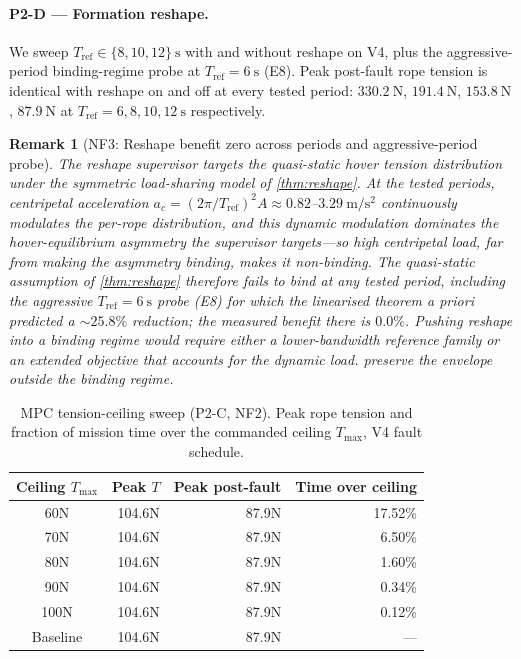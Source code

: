\documentclass[lettersize,journal]{IEEEtran}
\newtheorem{remark}{Remark}%
\begin{document}
\paragraph{P2-D --- Formation reshape.} We sweep $T_{\mathrm{ref}} \in \{8, 10, 12\}~\si{\second}$ with and without reshape on V4, plus the aggressive-period binding-regime probe at $T_{\mathrm{ref}}=\SI{6}{\second}$ (E8). Peak post-fault rope tension is identical with reshape on and off at every tested period: $\SI{330.2}{\newton}$, $\SI{191.4}{\newton}$, $\SI{153.8}{\newton}$, $\SI{87.9}{\newton}$ at $T_{\mathrm{ref}} = 6, 8, 10, 12~\si{\second}$ respectively.

\begin{remark}[NF3: Reshape benefit zero across periods and aggressive-period probe]
\label{rem:reshape-null}
  The reshape supervisor targets the quasi-static hover tension distribution under the symmetric load-sharing model of \cref{thm:reshape}. At the tested periods, centripetal acceleration $a_c = (2\pi/T_{\mathrm{ref}})^2 A \approx 0.82$--$3.29~\si{\metre\per\second\squared}$ continuously modulates the per-rope distribution, and this dynamic modulation dominates the hover-equilibrium asymmetry the supervisor targets---so high centripetal load, far from making the asymmetry binding, makes it \emph{non}-binding. The quasi-static assumption of \cref{thm:reshape} therefore fails to bind at any tested period, including the aggressive $T_{\mathrm{ref}}=\SI{6}{\second}$ probe (E8) for which the linearised theorem a priori predicted a $\sim 25.8\%$ reduction; the measured benefit there is $0.0\%$. Pushing reshape into a binding regime would require either a lower-bandwidth reference family or an extended objective that accounts for the dynamic load.  preserve the envelope outside the binding regime.
\end{remark}

\begin{table}[t]
  \caption{MPC tension-ceiling sweep (P2-C, NF2). Peak rope tension and fraction of mission time over the commanded ceiling $T_{\max}$, V4 fault schedule.}
  \label{tab:mpc-ceiling-sweep}
  \centering
  \small
  \renewcommand{\arraystretch}{1.05}
  \begin{tabular}{crrr}
    \toprule
    Ceiling $T_{\max}$ & Peak $T$ & Peak post-fault & Time over ceiling \\
    \midrule
    60N       & 104.6N & 87.9N & 17.52\% \\
    70N       & 104.6N & 87.9N & 6.50\%  \\
    80N       & 104.6N & 87.9N & 1.60\%  \\
    90N       & 104.6N & 87.9N & 0.34\%  \\
    100N      & 104.6N & 87.9N & 0.12\%  \\
    Baseline & 104.6N & 87.9N & ---   \\
    \bottomrule
  \end{tabular}
\end{table}
\end{document}
